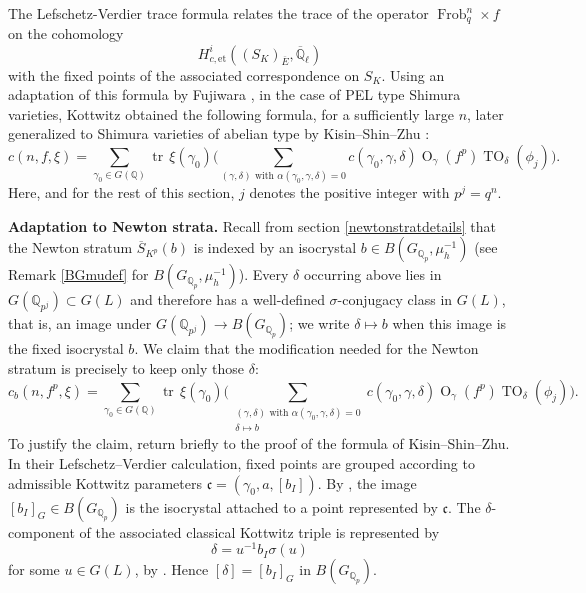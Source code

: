 \documentclass[11pt,a4paper]{article}
\theoremstyle{definition}
\theoremstyle{plain}
\theoremstyle{remark}
\theoremstyle{plain}
\DeclareMathOperator{\Frob}{Frob}
\DeclareMathOperator{\tr}{tr}
\DeclareMathOperator{\Or}{O}
\DeclareMathOperator{\TO}{TO}
\begin{document}
The Lefschetz-Verdier trace formula relates the trace of the operator $\Frob_q^n \times f$ on the cohomology
$$H^i_{c,\mathrm{et}}((S_K)_{\overline E}, \overline{\mathbb{Q}}_\ell)$$
with the fixed points of the associated correspondence on $S_K$. Using an adaptation of this formula by Fujiwara \cite{MR1431137}, in the case of PEL type Shimura varieties, Kottwitz \cite{MR1124982} obtained the following formula, for a sufficiently large $n$, later generalized to Shimura varieties of abelian type by Kisin--Shin--Zhu \cite{kisin2021stabletraceformulashimura}:
$$
    c(n,f,\xi) = \sum_{\gamma_0 \in G(\mathbb{Q})} \tr\,\xi(\gamma_0) \Biggl( \sum_{(\gamma, \delta) \text{ with } \alpha(\gamma_0,\gamma, \delta) = 0} c(\gamma_0, \gamma, \delta) \Or_{\gamma} (f^p) \TO_{\delta} (\phi_j) \Biggr).
$$
Here, and for the rest of this section, $j$ denotes the positive integer with $p^j = q^n$.

\textbf{Adaptation to Newton strata.}
Recall from section \ref{newtonstratdetails} that the Newton stratum $\overline{S}_{K^p}(b)$ is indexed by an isocrystal $b \in B(G_{\mathbb{Q}_p}, \mu_h^{-1})$ (see Remark \ref{BGmudef} for $B(G_{\mathbb{Q}_p}, \mu_h^{-1})$). Every $\delta$ occurring above lies in $G(\mathbb{Q}_{p^j}) \subset G(L)$ and therefore has a well-defined $\sigma$-conjugacy class in $G(L)$, that is, an image under $G(\mathbb{Q}_{p^j}) \xrightarrow[]{} B(G_{\mathbb{Q}_p})$; we write $\delta \mapsto b$ when this image is the fixed isocrystal $b$. We claim that the modification needed for the Newton stratum is precisely to keep only those $\delta$:
$$
    c_b(n,f^p,\xi) = \sum_{\gamma_0 \in G(\mathbb{Q})} \tr\,\xi(\gamma_0) \Biggl( \sum_{\substack{(\gamma, \delta) \text{ with } \alpha(\gamma_0,\gamma, \delta) = 0 \\ \delta \mapsto b}} c(\gamma_0, \gamma, \delta) \Or_{\gamma} (f^p) \TO_{\delta} (\phi_j) \Biggr).
$$
To justify the claim, return briefly to the proof of the formula of Kisin--Shin--Zhu. In their Lefschetz--Verdier calculation, fixed points are grouped according to admissible Kottwitz parameters $\mathfrak c=(\gamma_0,a,[b_I])$. By \cite[\S\S 2.2.7, 3.5.1]{kisin2021stabletraceformulashimura}, the image $[b_I]_G\in B(G_{\mathbb Q_p})$ is the isocrystal attached to a point represented by $\mathfrak c$. The $\delta$-component of the associated classical Kottwitz triple is represented by
$$
\delta=u^{-1}b_I\sigma(u)
$$
for some $u\in G(L)$, by \cite[Definition 1.6.5 and Lemma 1.6.7]{kisin2021stabletraceformulashimura}. Hence $[\delta]=[b_I]_G$ in $B(G_{\mathbb Q_p})$.
\end{document}
